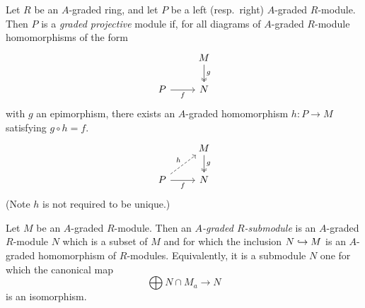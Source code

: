 \documentclass[../main.tex]{subfiles}
\begin{document}
\begin{definition}\label{graded_projective_module}
	Let $R$ be an $A$-graded ring, and let $P$ be a left (resp.\ right) $A$-graded $R$-module. Then $P$ is a \emph{graded projective} module if, for all diagrams of $A$-graded $R$-module homomorphisms of the form 
	\[\begin{tikzcd}
		& M \\
		P & N
		\arrow["f"', from=2-1, to=2-2]
		\arrow["g", two heads, from=1-2, to=2-2]
	\end{tikzcd}\]
	with $g$ an epimorphism, there exists an $A$-graded homomorphism $h:P\to M$ satisfying $g\circ h=f$.
	\[\begin{tikzcd}
		& M \\
		P & N
		\arrow["f"', from=2-1, to=2-2]
		\arrow["g", two heads, from=1-2, to=2-2]
		\arrow["h", dashed, from=2-1, to=1-2]
	\end{tikzcd}\]
	(Note $h$ is not required to be unique.)
\end{definition}

\begin{definition}
	Let $M$ be an $A$-graded $R$-module. Then an \emph{$A$-graded $R$-submodule} is an $A$-graded $R$-module $N$ which is a subset of $M$ and for which the inclusion $N\hookrightarrow M$ is an $A$-graded homomorphism of $R$-modules. Equivalently, it is a submodule $N$ one for which the canonical map
	\[\bigoplus N\cap M_a\to N\]
	is an isomorphism.
\end{definition}
\end{document}
